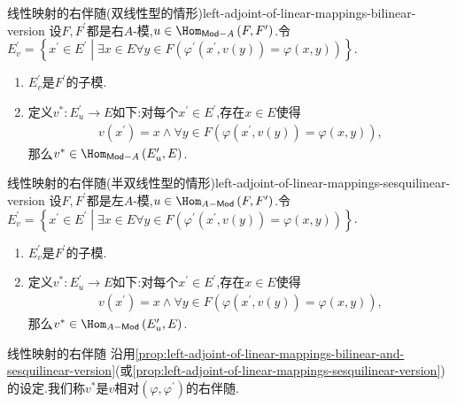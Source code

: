 \begin{proposition}{线性映射的右伴随(双线性型的情形)}{left-adjoint-of-linear-mappings-bilinear-version}
	设$F,F^{\prime}$都是右$A$-模,$u\in\Hom_{\mathsf{Mod}-A}\left(F,F^{\prime}\right)$.令$E_{v}^{\prime}=\left\{x^{\prime}\in E^{\prime}\middle|\exists x\in E\forall y\in F\left(\varphi^{\prime}\left(x^{\prime},v\left(y\right)\right)=\varphi\left(x,y\right)\right)\right\}$.
	\begin{enumerate}
		\item $E_{v}^{\prime}$是$F^{\prime}$的子模.
		\item 定义$v^{\ast}:E_{u}^{\prime}\to E$如下:对每个$x^{\prime}\in E^{\prime}$,存在$x\in E$使得
		\begin{align*}
			v\left(x^{\prime}\right)=x\wedge\forall y\in F\left(\varphi\left(x^{\prime},v\left(y\right)\right)=\varphi\left(x,y\right)\right),
		\end{align*}
		那么$v^{\ast}\in\Hom_{\mathsf{Mod}-A}\left(E_{u}^{\prime},E\right)$.
	\end{enumerate}
\end{proposition}

\begin{proposition}{线性映射的右伴随(半双线性型的情形)}{left-adjoint-of-linear-mappings-sesquilinear-version}
	设$F,F^{\prime}$都是左$A$-模,$u\in\Hom_{A-\mathsf{Mod}}\left(F,F^{\prime}\right)$.令$E_{v}^{\prime}=\left\{x^{\prime}\in E^{\prime}\middle|\exists x\in E\forall y\in F\left(\varphi^{\prime}\left(x^{\prime},v\left(y\right)\right)=\varphi\left(x,y\right)\right)\right\}$.
	\begin{enumerate}
		\item $E_{v}^{\prime}$是$F^{\prime}$的子模.
		\item 定义$v^{\ast}:E_{u}^{\prime}\to E$如下:对每个$x^{\prime}\in E^{\prime}$,存在$x\in E$使得
		\begin{align*}
			v\left(x^{\prime}\right)=x\wedge\forall y\in F\left(\varphi\left(x^{\prime},v\left(y\right)\right)=\varphi\left(x,y\right)\right),
		\end{align*}
		那么$v^{\ast}\in\Hom_{A-\mathsf{Mod}}\left(E_{u}^{\prime},E\right)$.
	\end{enumerate}
\end{proposition}

\begin{definition}{线性映射的右伴随}{}
	沿用\cref{prop:left-adjoint-of-linear-mappings-bilinear-and-sesquilinear-version}(或\cref{prop:left-adjoint-of-linear-mappings-sesquilinear-version})的设定.我们称$v^{\ast}$是$v$相对$\left(\varphi,\varphi^{\prime}\right)$的右伴随.
\end{definition}

